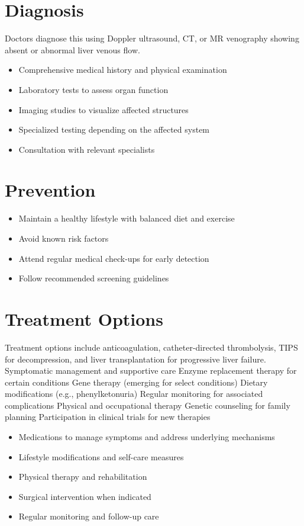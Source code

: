 \section{Diagnosis}
Doctors diagnose this using Doppler ultrasound, CT, or MR venography showing absent or abnormal liver venous flow.

\begin{itemize}[noitemsep]
  \item Comprehensive medical history and physical examination
  \item Laboratory tests to assess organ function
  \item Imaging studies to visualize affected structures
  \item Specialized testing depending on the affected system
  \item Consultation with relevant specialists
\end{itemize}
\section{Prevention}
\begin{itemize}[noitemsep]
  \item Maintain a healthy lifestyle with balanced diet and exercise
  \item Avoid known risk factors
  \item Attend regular medical check-ups for early detection
  \item Follow recommended screening guidelines
\end{itemize}
\section{Treatment Options}
Treatment options include anticoagulation, catheter-directed thrombolysis, TIPS for decompression, and liver transplantation for progressive liver failure. Symptomatic management and supportive care Enzyme replacement therapy for certain conditions Gene therapy (emerging for select conditions) Dietary modifications (e.g., phenylketonuria) Regular monitoring for associated complications Physical and occupational therapy Genetic counseling for family planning Participation in clinical trials for new therapies

\begin{itemize}[noitemsep]
  \item Medications to manage symptoms and address underlying mechanisms
  \item Lifestyle modifications and self-care measures
  \item Physical therapy and rehabilitation
  \item Surgical intervention when indicated
  \item Regular monitoring and follow-up care
\end{itemize}
